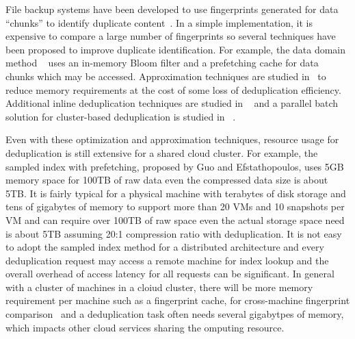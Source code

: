 File backup systems have been developed to use fingerprints generated for
data ``chunks''  to identify duplicate
content~\cite{venti02,Rhea2008}.  In a simple implementation,
it is expensive to compare a large number of 
fingerprints
so several techniques have been proposed to improve duplicate identification. 
For example, the data domain method ~\cite{bottleneck08} 
uses  an in-memory Bloom filter and a prefetching cache for data chunks 
which may be
accessed.  
Approximation techniques are studied in~\cite{extreme_binning09,Guo2011,WeiZhangIEEE}  
to reduce memory requirements at the cost of some loss of deduplication
efficiency.
Additional inline deduplication techniques are studied in ~\cite{sparseindex09,Guo2011,Srinivasan2012}
and a parallel batch solution for cluster-based deduplication is 
studied in ~\cite{wei2013}. 


Even with these optimization and approximation techniques, resource usage for deduplication
is still extensive for a shared cloud cluster.  For example, the
sampled index with prefetching, proposed  by Guo and Efstathopoulos\cite{Guo2011},
uses 5GB memory space for 100TB of raw data even the compressed data size
is about 5TB. It is fairly typical for
a physical machine with terabytes of disk storage and tens of gigabytes of memory
to support  more than 20 VMs and 10 snapshots per VM and can require  over 100TB of raw space
even the actual storage space need is about 5TB assuming 20:1 compression ratio with deduplication.
It is not easy  to adopt the sampled index method  for a distributed architecture
and every deduplication request may access a remote machine for index lookup and the overall overhead of access latency 
for all requests can be significant.  In general
with a cluster of machines in a cloiud cluster, there will be more memory requirement per machine such as a 
fingerprint cache, for cross-machine fingerprint comparison~\cite{bottleneck08,Dong2011} and a deduplication
task often needs several gigabytpes of memory, which impacts other cloud services sharing the omputing resource.


